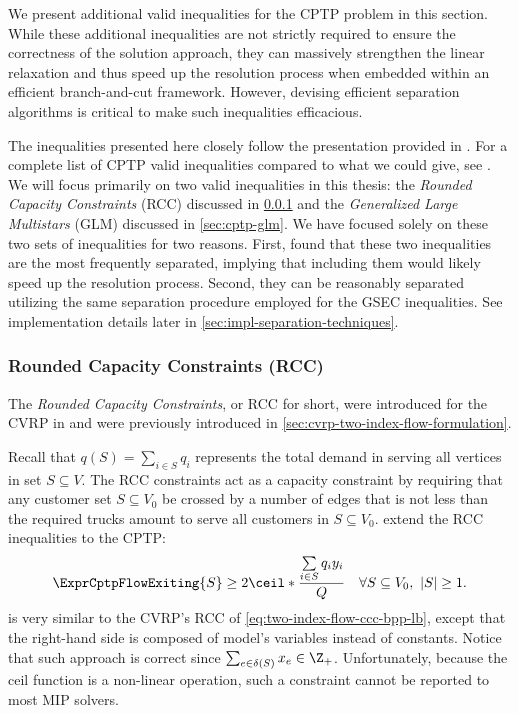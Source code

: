 We present additional valid inequalities for the CPTP problem in this section.
While these additional inequalities are not strictly required
to ensure the correctness of the solution approach,
they can massively strengthen the linear relaxation
and thus speed up the resolution process when embedded within an efficient branch-and-cut framework.
However, devising efficient separation algorithms is critical to make such inequalities efficacious.

The inequalities presented here closely follow the presentation provided in \textcite{jepsen2014}.
For a complete list of CPTP valid inequalities compared to what we could give, see \textcite{jepsen2014}.
We will focus primarily on two valid inequalities in this thesis:
the \textit{Rounded Capacity Constraints} (RCC) discussed in \cref{sec:cptp-rcc}
and the \textit{Generalized Large Multistars} (GLM) discussed in \cref{sec:cptp-glm}.
We have focused solely on these two sets of inequalities for two reasons.
First, \textcite{jepsen2014} found that these two inequalities
are the most frequently separated,
implying that including them would likely speed up the resolution process.
Second, they can be reasonably separated utilizing
the same separation procedure employed for the GSEC inequalities.
See implementation details later in \cref{sec:impl-separation-techniques}.

\subsubsection{Rounded Capacity Constraints (RCC)}
\label{sec:cptp-rcc}

The \textit{Rounded Capacity Constraints}, or RCC for short,
were introduced for the CVRP in \textcite{laporte1983}
and were previously introduced in \cref{sec:cvrp-two-index-flow-formulation}.

Recall that $q(S) = \sum_{i \in S} q_i$ represents
the total demand in serving all vertices in set $S \subseteq V$.
The RCC constraints act as a capacity constraint
by requiring that any customer set $S \subseteq V_0$ be crossed by
a number of edges that is not less than the required trucks amount
to serve all customers in $S \subseteq V_0$.
\textcite{jepsen2014} extend the RCC inequalities to the CPTP:
\begin{equation}
	\label{eq:cptp-rcc-inequality-original}
	\ExprCptpFlowExiting{S} \ge 2 \ceil*{\frac{\sum\limits_{i \in S} q_i y_i}{Q}} \quad \forall S \subseteq V_0,\ |S| \ge 1.
\end{equation}
 is very similar
to the CVRP's RCC of \cref{eq:two-index-flow-ccc-bpp-lb},
except that the right-hand side is composed of model's variables instead of constants.
Notice that such approach is correct since $\sum_{e \in \delta(S)} x_e \in \Z_+$.
Unfortunately, because the ceil function is a non-linear operation,
such a constraint cannot be reported to most MIP solvers.

